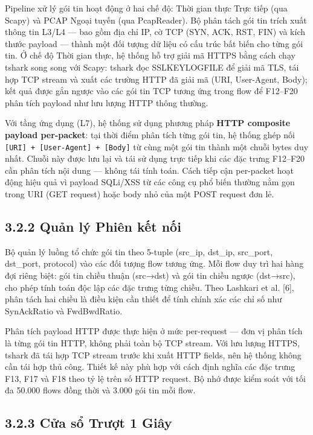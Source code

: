 \documentclass[12pt,a4paper,twoside]{report}
\begin{document}
{Pipeline xử lý gói tin hoạt động ở hai chế độ: Thời gian thực Trực tiếp (qua Scapy) và PCAP Ngoại tuyến (qua PcapReader). Bộ phân tách gói tin trích xuất thông tin L3/L4 — bao gồm địa chỉ IP, cờ TCP (SYN, ACK, RST, FIN) và kích thước payload — thành một đối tượng dữ liệu có cấu trúc bất biến cho từng gói tin. Ở chế độ Thời gian thực, hệ thống hỗ trợ giải mã HTTPS bằng cách chạy tshark song song với Scapy: tshark đọc SSLKEYLOGFILE để giải mã TLS, tái hợp TCP stream và xuất các trường HTTP đã giải mã (URI, User-Agent, Body); kết quả được gắn ngược vào các gói tin TCP tương ứng trong flow để F12–F20 phân tích payload như lưu lượng HTTP thông thường.

Với tầng ứng dụng (L7), hệ thống sử dụng phương pháp \textbf{HTTP composite payload per-packet}: tại thời điểm phân tích từng gói tin, hệ thống ghép nối \texttt{[URI] + [User-Agent] + [Body]} từ cùng một gói tin thành một chuỗi bytes duy nhất. Chuỗi này được lưu lại và tái sử dụng trực tiếp khi các đặc trưng F12–F20 cần phân tích nội dung — không tái tính toán. Cách tiếp cận per-packet hoạt động hiệu quả vì payload SQLi/XSS từ các công cụ phổ biến thường nằm gọn trong URI (GET request) hoặc body nhỏ của một POST request đơn lẻ.

\subsection{3.2.2 Quản lý Phiên kết nối}

Bộ quản lý luồng tổ chức gói tin theo 5-tuple (src_ip, dst_ip, src_port, dst_port, protocol) vào các đối tượng flow tương ứng. Mỗi flow duy trì hai hàng đợi riêng biệt: gói tin chiều thuận (src→dst) và gói tin chiều ngược (dst→src), cho phép tính toán độc lập các đặc trưng từng chiều. Theo Lashkari et al. [6], phân tách hai chiều là điều kiện cần thiết để tính chính xác các chỉ số như SynAckRatio và FwdBwdRatio.

Phân tích payload HTTP được thực hiện ở mức per-request — đơn vị phân tích là từng gói tin HTTP, không phải toàn bộ TCP stream. Với lưu lượng HTTPS, tshark đã tái hợp TCP stream trước khi xuất HTTP fields, nên hệ thống không cần tái hợp thủ công. Thiết kế này phù hợp với cách định nghĩa các đặc trưng F13, F17 và F18 theo tỷ lệ trên số HTTP request. Bộ nhớ được kiểm soát với tối đa 50.000 flows đồng thời và 3.000 gói tin mỗi flow.

\subsection{3.2.3 Cửa sổ Trượt 1 Giây}

}
\end{document}
